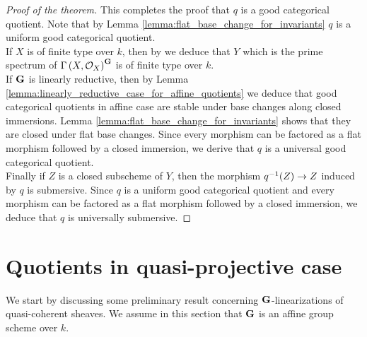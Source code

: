 \begin{proof}[Proof of the theorem]
This completes the proof that $q$ is a good categorical quotient. Note that by Lemma \ref{lemma:flat_base_change_for_invariants} $q$ is a uniform good categorical quotient.\\
If $X$ is of finite type over $k$, then by {\cite[Theorem 3.1]{Geometrically_reductive_and_Nagata}} we deduce that $Y$ which is the prime spectrum of $\Gamma\left(X,{\mathcal O}_X\right)^{\mathbf{G}}$ is of finite type over $k$.\\
If $\mathbf{G}$ is linearly reductive, then by Lemma \ref{lemma:linearly_reductive_case_for_affine_quotients} we deduce that good categorical quotients in affine case are stable under base changes along closed immersions. Lemma \ref{lemma:flat_base_change_for_invariants} shows that they are closed under flat base changes. Since every morphism can be factored as a flat morphism followed by a closed immersion, we derive that $q$ is a universal good categorical quotient.\\
Finally if $Z$ is a closed subscheme of $Y$, then the morphism $q^{-1}(Z)\rightarrow Z$ induced by $q$ is submersive. Since $q$ is a uniform good categorical quotient and every morphism can be factored as a flat morphism followed by a closed immersion, we deduce that $q$ is universally submersive.
\end{proof}

\section{Quotients in quasi-projective case}
\noindent
We start by discussing some preliminary result concerning $\mathbf{G}$-linearizations of quasi-coherent sheaves. We assume in this section that $\mathbf{G}$ is an affine group scheme over $k$.

